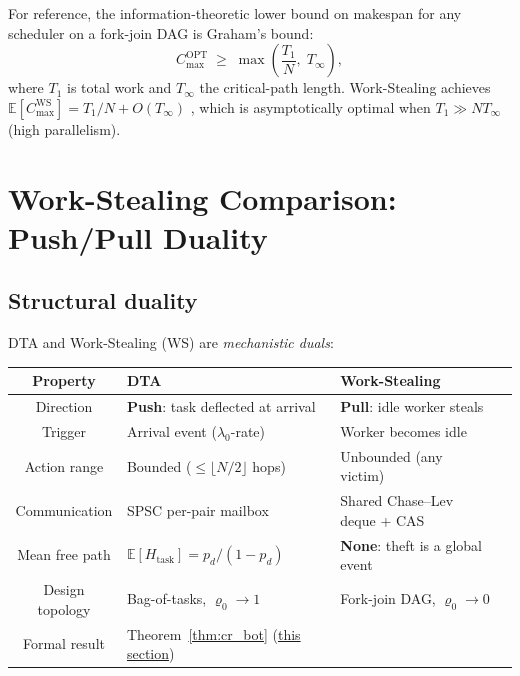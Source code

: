 \documentclass[11pt,a4paper]{report}
\begin{document}
For reference, the information-theoretic lower bound on makespan for
any scheduler on a fork-join DAG is Graham's bound:
\begin{equation}\label{eq:graham}
  C_{\max}^{\mathrm{OPT}} \;\ge\; \max\!\left(\frac{T_1}{N},\; T_\infty\right),
\end{equation}
where $T_1$ is total work and $T_\infty$ the critical-path length.
Work-Stealing achieves $\mathbb{E}[C_{\max}^{\mathrm{WS}}] = T_1/N + O(T_\infty)$
\cite{blumofe1999}, which is asymptotically optimal when $T_1 \gg N T_\infty$
(high parallelism).

\section{Work-Stealing Comparison: Push/Pull Duality}
\label{sec:ws_compare}

\subsection{Structural duality}

DTA and Work-Stealing (WS) are \emph{mechanistic duals}:

\medskip
\noindent
\begin{tabularx}{\textwidth}{@{}clXl@{}}
\toprule
Property & DTA & Work-Stealing \\
\midrule
Direction & \textbf{Push}: task deflected at arrival & \textbf{Pull}: idle worker steals \\
Trigger & Arrival event ($\lambda_0$-rate) & Worker becomes idle \\
Action range & Bounded ($\le \lfloor N/2 \rfloor$ hops) & Unbounded (any victim) \\
Communication & SPSC per-pair mailbox & Shared Chase--Lev deque + CAS \\
Mean free path & $\mathbb{E}[H_{\mathrm{task}}] = p_d/(1-p_d)$ & \textbf{None}: theft is a global event \\
Design topology & Bag-of-tasks, $\varrho_0 \to 1$ & Fork-join DAG, $\varrho_0 \to 0$ \\
Formal result & Theorem~\ref{thm:cr_bot} (\hyperref[chap:kinetic_theory]{this section}) & \cite{blumofe1999} \\
\bottomrule
\end{tabularx}

\medskip
\end{document}
